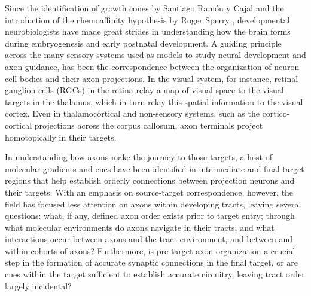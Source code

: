 Since the identification of growth cones by Santiago Ram\'on y Cajal and the introduction of the chemoaffinity hypothesis by Roger Sperry \cite{sperry1963chemoaffinity}, developmental neurobiologists have made great strides in understanding how the brain forms during embryogenesis and early postnatal development.
A guiding principle across the many sensory systems used as models to study neural development and axon guidance, has been the correspondence between the organization of neuron cell bodies and their axon projections.
In the visual system, for instance, retinal ganglion cells (RGCs) in the retina relay a map of visual space to the visual targets in the thalamus, which in turn relay this spatial information to the visual cortex.
Even in thalamocortical and non-sensory systems, such as the cortico-cortical projections across the corpus callosum, axon terminals project homotopically in their targets. 

In understanding how axons make the journey to those targets, a host of molecular gradients and cues have been identified in intermediate and final target regions that help establish orderly connections between projection neurons and their targets.
With an emphasis on source-target correspondence, however, the field has focused less attention on axons within developing tracts, leaving several questions: what, if any, defined axon order exists prior to target entry; through what molecular environments do axons navigate in their tracts; and what interactions occur between axons and the tract environment, and between and within cohorts of axons?
Furthermore, is pre-target axon organization a crucial step in the formation of accurate synaptic connections in the final target, or are cues within the target sufficient to establish accurate circuitry, leaving tract order largely incidental?

